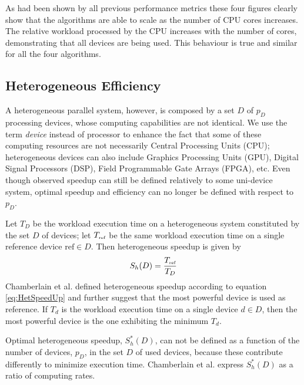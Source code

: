 As had been shown by all previous performance metrics these four figures clearly show that the algorithms are able to scale as the number of CPU cores increases. The relative workload processed by the CPU increases with the number of cores, demonstrating that all devices are being used. This behaviour is true and similar for all the four algorithms.

\subsection{Heterogeneous Efficiency}

A heterogeneous parallel system, however, is composed by a set $D$ of $p_D$ processing devices, whose computing capabilities are not identical. We use the term {\em device} instead of processor to enhance the fact that some of these computing resources are not necessarily Central Processing Units (CPU); heterogeneous devices can also include Graphics Processing Units (GPU), Digital Signal Processors (DSP), Field Programmable Gate Arrays (FPGA), etc. Even though observed speedup can still be defined relatively to some uni-device system, optimal speedup and efficiency can no longer be defined with respect to $p_D$.

Let $T_D$ be the workload execution time on a heterogeneous system constituted by the set $D$ of devices; let $T_{\mbox{\tiny ref}}$ be the same workload execution time on a single reference device $\mbox{ref} \in D$. Then heterogeneous speedup is given by
\begin{equation}
S_h(D) = \frac{T_{\mbox{\tiny ref}}}{T_D}
\label{eq:HetSpeedUp}
\end{equation}
Chamberlain et al. \cite{Chamberlain98} defined heterogeneous speedup according to equation \ref{eq:HetSpeedUp} and further suggest that the most powerful device is used as reference. If $T_d$ is the workload execution time on a single device $d \in D$, then the most powerful device is the one exhibiting the minimum $T_d$.

Optimal heterogeneous speedup, $S_h^*(D)$, can not be defined as a function of the number of devices, $p_D$, in the set $D$ of used devices, because these contribute differently to minimize execution time. Chamberlain et al. \cite{Chamberlain98} express $S_h^*(D)$ as a ratio of computing rates. 

